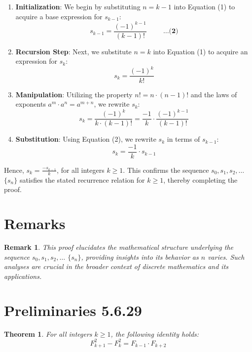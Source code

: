 \documentclass[12pt]{article}
\newtheorem{theorem}{Theorem}
\newtheorem{remark}{Remark}
\begin{document}
\begin{enumerate}[label=\arabic*.]
    \item \textbf{Initialization}: We begin by substituting \( n = k - 1 \) into Equation (1) to acquire a base expression for \( s_{k-1} \):
    \[
    s_{k-1} = \frac{{(-1)^{k-1}}}{{(k-1)!}} \hspace{1cm} \textbf{\ldots(2)}
    \]
    
    \item \textbf{Recursion Step}: Next, we substitute \( n = k \) into Equation (1) to acquire an expression for \( s_k \):
    \[
    s_k = \frac{{(-1)^k}}{{k!}}
    \]
    
    \item \textbf{Manipulation}: Utilizing the property \( n! = n \cdot (n-1)! \) and the laws of exponents \( a^m \cdot a^n = a^{m+n} \), we rewrite \( s_k \):
    \[
    s_k = \frac{{(-1)^k}}{{k \cdot (k-1)!}} = \frac{{-1}}{{k}} \cdot \frac{{(-1)^{k-1}}}{{(k-1)!}}
    \]
    
    \item \textbf{Substitution}: Using Equation (2), we rewrite \( s_k \) in terms of \( s_{k-1} \):
    \[
    s_k = \frac{{-1}}{{k}} \cdot s_{k-1}
    \]
\end{enumerate}
Hence, \( s_k = \frac{{-s_{k-1}}}{{k}} \), for all integers \( k \geq 1 \). This confirms the sequence \( s_0, s_1, s_2, \ldots \) \( \{ s_n \} \) satisfies the stated recurrence relation for \( k \geq 1 \), thereby completing the proof.

\section{Remarks}
\begin{remark}
This proof elucidates the mathematical structure underlying the sequence \( s_0, s_1, s_2, \ldots \) \( \{ s_n \} \), providing insights into its behavior as \( n \) varies. Such analyses are crucial in the broader context of discrete mathematics and its applications.
\end{remark}

\section{Preliminaries 5.6.29}

\begin{theorem}
For all integers \( k \ge 1 \), the following identity holds:
\[ F_{k+1}^2 - F_k^2 = F_{k-1} \cdot F_{k+2} \]
\end{theorem}
\end{document}
